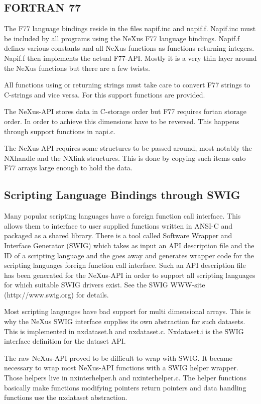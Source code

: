 \documentclass[a4paper]{article}
\begin{document}
\subsection{FORTRAN 77 }
The F77 language bindings reside in the files napif.inc and napif.f. Napif.inc must be included by 
all programs using the NeXus F77 language bindings. Napif.f defines various constants and all 
NeXus functions as functions returning integers. Napif.f then implements the actual F77-API. Mostly 
it is a very thin layer around the NeXus functions but there are a few twists.


All functions using or returning strings must take care to convert F77 strings to C-strings and vice 
versa. For this support functions are provided. 


The NeXus-API stores data in C-storage order but F77 requires fortan storage order. In order to 
achieve this dimensions have to be reversed. This happens through support functions in napi.c.


The NeXus API requires some structures to be passed around, most notably the NXhandle and the 
NXlink structures. This is done by copying such items onto F77 arrays large enough to 
hold the data.


\subsection{Scripting Language Bindings through SWIG }
Many popular scripting languages have a foreign function call interface. This allows them to 
interface to user supplied functions written in ANSI-C and packaged as a shared library. 
There is a tool called Software Wrapper and Interface Generator (SWIG) which takes as input an 
API description file and the ID of a scripting language and the goes away and generates wrapper 
code for the scripting languages foreign function call interface.  Such an API description file 
has been generated for the NeXus-API in order to support all scripting languages for which suitable 
SWIG drivers exist. See the SWIG WWW-site (http://www.swig.org) for details.  


Most scripting languages have bad support for multi dimensional arrays. This is why the NeXus SWIG 
interface supplies its own abstraction for such datasets. This is implemented in nxdataset.h and 
nxdataset.c. Nxdataset.i is the SWIG interface definition for the dataset API.


The raw NeXus-API proved to be difficult to wrap with SWIG. It became necessary to wrap most 
NeXus-API functions with a SWIG helper wrapper. Those helpers live in   nxinterhelper.h and 
nxinterhelper.c. The helper functions basically make functions modifying pointers return 
pointers and data handling functions use the nxdataset abstraction. 
\end{document}
